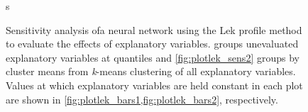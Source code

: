 \documentclass[article,shortnames]{jss}\usepackage[]{graphicx}\usepackage[]{color}
\begin{document}
\begin{figure}
\centering
{}

s
\caption{Sensitivity analysis ofa  neural network using the Lek profile method to evaluate the effects of explanatory variables.   groups unevaluated explanatory variables at quantiles and \cref{fig:plotlek_sens2} groups by cluster means from {\it k}-means clustering of all explanatory variables.  Values at which explanatory variables are held constant in each plot are shown in \cref{fig:plotlek_bars1,fig:plotlek_bars2}, respectively.}
\label{fig:plotlek_sens}
\end{figure}
\end{document}
